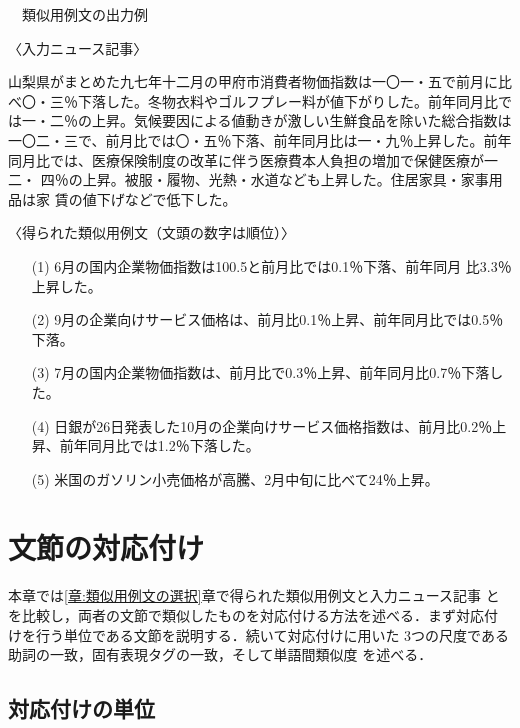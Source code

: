 \documentclass[japanese]{jnlp_1.4}
\newcounter{exp}
\def\exp#1{}
\begin{document}
\begin{screen}
\exp{例:類似用例出力}　類似用例文の出力例

〈入力ニュース記事〉

{\setlength{\leftskip}{2zw}
山梨県がまとめた九七年十二月の甲府市消費者物価指数は一〇一・五で前月に比
 べ〇・三％下落した。冬物衣料やゴルフプレー料が値下がりした。前年同月比で
 は一・二％の上昇。気候要因による値動きが激しい生鮮食品を除いた総合指数は
 一〇二・三で、前月比では〇・五％下落、前年同月比は一・九％上昇した。前年
 同月比では、医療保険制度の改革に伴う医療費本人負担の増加で保健医療が一二・
 四％の上昇。被服・履物、光熱・水道なども上昇した。住居家具・家事用品は家
 賃の値下げなどで低下した。
\par}

〈得られた類似用例文（文頭の数字は順位）〉
\begin{itemize}
\item[(1)]
6月の国内企業物価指数は100.5と前月比では0.1％下落、前年同月
 比3.3％上昇した。

\item[(2)]
9月の企業向けサービス価格は、前月比0.1％上昇、前年同月比では0.5％下落。

\item[(3)]
7月の国内企業物価指数は、前月比で0.3％上昇、前年同月比0.7％下落した。

\item[(4)]
日銀が26日発表した10月の企業向けサービス価格指数は、前月比0.2％上昇、前年同月比では1.2％下落した。

\item[(5)]
米国のガソリン小売価格が高騰、2月中旬に比べて24％上昇。
\end{itemize}
\end{screen}




\section{文節の対応付け}\label{章:文節の対応付け}

本章では\ref{章:類似用例文の選択}章で得られた類似用例文と入力ニュース記事
とを比較し，両者の文節で類似したものを対応付ける方法を述べる．まず対応付
けを行う単位である文節を説明する．続いて対応付けに用いた
3つの尺度である助詞の一致，固有表現タグの一致，そして単語間類似度
を述べる．

\subsection{対応付けの単位}\label{節:対応付けの単位}
\end{document}
